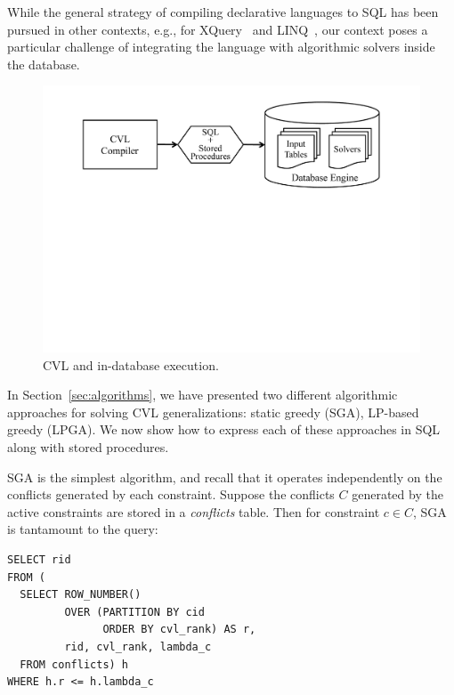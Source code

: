 While the general strategy of compiling declarative languages to SQL has been pursued in other contexts, e.g., for XQuery~\cite{pathfinder} and LINQ~\cite{ferry}, our context poses a particular challenge of integrating the language with algorithmic solvers inside the database. 

\begin{figure}[htbp]
\begin{center}
\includegraphics[scale=.35,viewport=400 375 450 550]{figs/indatabase-execution.pdf}
\caption{CVL and in-database execution.}
\label{fig:indatabase}
\end{center}
\end{figure}

In Section~\ref{sec:algorithms}, we have presented two different algorithmic approaches for solving CVL generalizations: static greedy (SGA), LP-based greedy (LPGA). We now show how to express each of these approaches in SQL along with stored procedures. 

SGA is the simplest algorithm, and recall that it operates independently on the conflicts generated by each constraint. Suppose the conflicts $C$ generated by the active constraints are stored in a \emph{conflicts} table. Then for constraint $c \in C$, SGA is tantamount to the query:

\begin{lstlisting}
SELECT rid
FROM (
  SELECT ROW_NUMBER() 
         OVER (PARTITION BY cid
               ORDER BY cvl_rank) AS r,
         rid, cvl_rank, lambda_c
  FROM conflicts) h
WHERE h.r <= h.lambda_c
\end{lstlisting}


